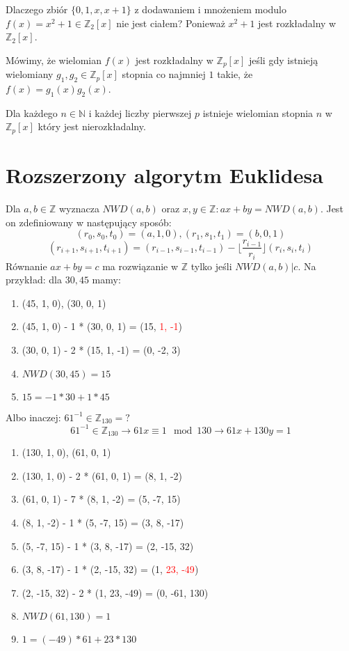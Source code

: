 \documentclass{../notatki}
\begin{document}
Dlaczego zbiór $\{0, 1, x, x + 1\}$ z dodawaniem i mnożeniem modulo
$f(x) = x^2 + 1 \in \mathbb{Z}_2[x]$ nie jest ciałem? Ponieważ $x^2 +
1$ jest rozkładalny w $\mathbb{Z}_2[x]$.

Mówimy, że wielomian $f(x)$ jest rozkładalny w $\mathbb{Z}_p[x]$
jeśli gdy istnieją
wielomiany $g_1, g_2 \in \mathbb{Z}_p[x]$ stopnia co najmniej $1$ takie, że
$f(x) = g_1(x)g_2(x)$.

Dla każdego $n \in \mathbb{N}$ i każdej liczby pierwszej $p$ istnieje wielomian
stopnia $n$ w $\mathbb{Z}_p[x]$ który jest nierozkładalny.

\section{Rozszerzony algorytm Euklidesa}

Dla $a, b \in \mathbb{Z}$ wyznacza $NWD(a, b)$ oraz $x, y \in
\mathbb{Z} : ax + by = NWD(a, b)$. Jest on zdefiniowany w następujący sposób:
$$
(r_0, s_0, t_0) = (a, 1, 0), (r_1, s_1, t_1) = (b, 0, 1)
$$
$$
(r_{i + 1}, s_{i + 1}, t_{i + 1}) = (r_{i - 1}, s_{i - 1}, t_{i - 1}) - \lfloor
\frac{r_{i - 1}}{r_i} \rfloor (r_i, s_i, t_i)
$$
Równanie $ax + by = c$ ma rozwiązanie w $\mathbb{Z}$ tylko jeśli
$NWD(a, b) | c$.
Na przykład: dla $30, 45$ mamy:
\begin{enumerate}
  \item (45, 1, 0), (30, 0, 1)
  \item (45, 1, 0) - 1 * (30, 0, 1) = (15, \textcolor{red}{1, -1})
  \item (30, 0, 1) - 2 * (15, 1, -1) = (0, -2, 3)
  \item $NWD(30, 45) = 15$
  \item $15 = -1 * 30 + 1 * 45$
\end{enumerate}
Albo inaczej: $61^{-1} \in \mathbb{Z}_{130} = ?$
$$
61^{-1} \in \mathbb{Z}_{130} \rightarrow 61x \equiv 1 \mod 130
\rightarrow 61x + 130y = 1
$$
\begin{enumerate}
  \item (130, 1, 0), (61, 0, 1)
  \item (130, 1, 0) - 2 * (61, 0, 1) = (8, 1, -2)
  \item (61, 0, 1) - 7 * (8, 1, -2) = (5, -7, 15)
  \item (8, 1, -2) - 1 * (5, -7, 15) = (3, 8, -17)
  \item (5, -7, 15) - 1 * (3, 8, -17) = (2, -15, 32)
  \item (3, 8, -17) - 1 * (2, -15, 32) = (1, \textcolor{red}{23, -49})
  \item (2, -15, 32) - 2 * (1, 23, -49) = (0, -61, 130)
  \item $NWD(61, 130) = 1$
  \item $1 = (-49) * 61 + 23 * 130$
\end{enumerate}
\end{document}
